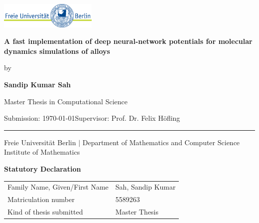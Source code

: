 \documentclass[a4paper,11pt,oneside]{article}
\newcommand{\mylastname}{Sah}
\newcommand{\myfirstname}{Sandip Kumar}
\newcommand{\mynumber}{5589263}
\newcommand{\myname}{\myfirstname{} \mylastname{}}
\newcommand{\mytitle}{A fast implementation of deep neural-network potentials for molecular dynamics simulations of alloys}
\newcommand{\mysupervisor}{Prof. Dr. Felix Höfling}
\begin{document}
\thispagestyle{empty}

\begin{flushright}
  \includegraphics[width=0.35\textwidth]{fub_logo_2.svg.png}
\end{flushright}
\vspace{10mm}


\vspace*{40mm}
\begin{center}
  \huge
  \textbf{\mytitle}
\end{center}
\vspace*{4mm}
\begin{center}
  \Large by
\end{center}
\vspace*{4mm}
\begin{center}
  \LARGE
  \textbf{\myname}
\end{center}
\vspace*{20mm}
\begin{center}
  \Large
  Master Thesis in Computational Science
\end{center}
\vfill
\begin{flushleft}
  \large
  Submission: \today \hfill Supervisor: \mysupervisor \\
  \rule{\textwidth}{1pt}
\end{flushleft}
\begin{center}
  Freie Universität Berlin $|$ Department of Mathematics and Computer Science\\
  Institute of Mathematics
\end{center}

\newpage
\thispagestyle{empty}

\begin{center}
  \Large \textbf{Statutory Declaration}
  \vspace*{8mm}
\end{center}

\begin{center}
  \begin{tabular}{|l|p{85mm}|}
    \hline
    Family Name, Given/First Name & \mylastname, \myfirstname \\
    Matriculation number          & \mynumber                 \\
    Kind of thesis submitted      & Master Thesis             \\
    \hline
  \end{tabular}
  \vspace*{8mm}
\end{center}
\end{document}

